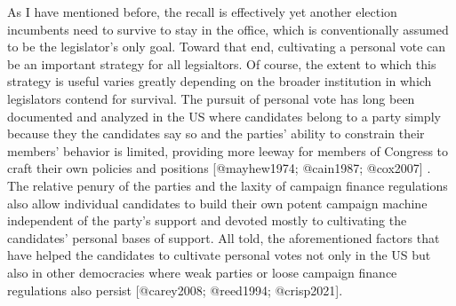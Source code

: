 \documentclass[hyphens, crop=false]{standalone}
\begin{document}
		As I have mentioned before,
		the recall is effectively yet another election incumbents need to survive to stay in the office,
		which is conventionally assumed to be the legislator's only goal.
		Toward that end,
		cultivating a personal vote can be an important strategy for all legsialtors.
		Of course,
		the extent to which this strategy is useful varies greatly depending on the broader institution in which legislators contend for survival.
		The pursuit of personal vote has long been documented and analyzed in the US where candidates belong to a party simply because they the candidates say so and the parties' ability to constrain their members' behavior is limited,
		providing more leeway for members of Congress to craft their own policies and positions [@mayhew1974; @cain1987; @cox2007] .
		The relative penury of the parties and the laxity of campaign finance regulations also allow individual candidates to build their own potent campaign machine independent of the party's support and devoted mostly to cultivating the candidates' personal bases of support.
		All told,
		the aforementioned factors that have helped the candidates to cultivate personal votes not only in the US but also in other democracies where weak parties or loose campaign finance regulations also persist [@carey2008; @reed1994; @crisp2021].
		
\end{document}
